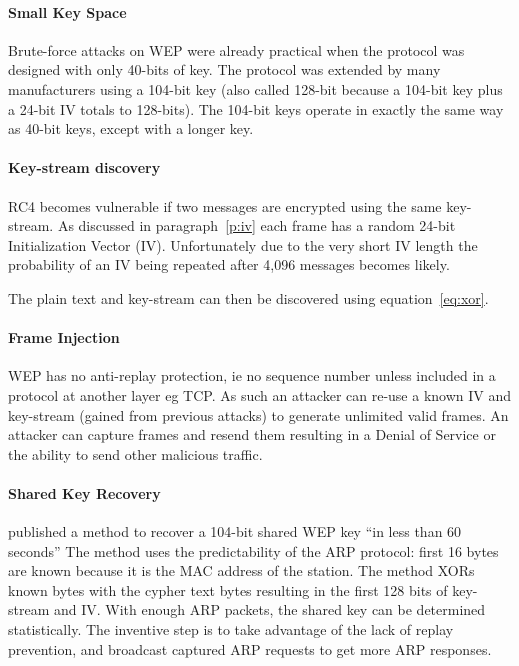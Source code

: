 \documentclass[pdftex, 12pt, a4paper]{article}
\begin{document}
\paragraph{Small Key Space}
Brute-force attacks on WEP were already practical when the protocol was designed with only 40-bits of key.  The protocol was extended by many manufacturers using a 104-bit key (also called 128-bit because a 104-bit key plus a 24-bit IV totals to 128-bits).  The 104-bit keys operate in exactly the same way as 40-bit keys, except with a longer key.

\paragraph{Key-stream discovery}
RC4 becomes vulnerable if two messages are encrypted using the same key-stream.  As discussed in paragraph~\ref{p:iv} each frame has a random 24-bit Initialization Vector (IV).  Unfortunately due to the very short IV length the probability of an IV being repeated after 4,096 messages becomes likely.

The plain text and key-stream can then be discovered using equation~\ref{eq:xor}.

\paragraph{Frame Injection}
WEP has no anti-replay protection, ie no sequence number unless included in a protocol at another layer eg TCP. As such an attacker can re-use a known IV and key-stream (gained from previous attacks) to generate unlimited valid frames.  An attacker can capture frames and resend them resulting in a Denial of Service or the ability to send other malicious traffic.

\paragraph{Shared Key Recovery}
\textcite{tews2007breaking} published a method to recover a 104-bit shared WEP key ``in less than 60 seconds''  The method uses the predictability of the ARP protocol: first 16 bytes are known because it is the MAC address of the station.
The method XORs known bytes with the cypher text bytes resulting in the first 128 bits of key-stream and IV. With enough ARP packets, the shared key can be determined statistically.
The inventive step is to take advantage of the lack of replay prevention, and broadcast captured ARP requests to get more ARP responses.
\end{document}
